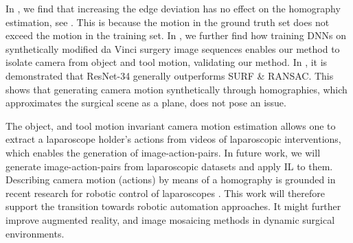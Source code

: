 
In , we find that increasing the edge deviation has no effect on the homography estimation, see . This is because the motion in the ground truth set does not exceed the motion in the training set. In , we further find how training DNNs on synthetically modified da Vinci surgery image sequences enables our method to isolate camera from object and tool motion, validating our method. In , it is demonstrated that ResNet-34 generally outperforms SURF \& RANSAC. This shows that generating camera motion synthetically through homographies, which approximates the surgical scene as a plane, does not pose an issue.


The object, and tool motion invariant camera motion estimation allows one to extract a laparoscope holder's actions from videos of laparoscopic interventions, which enables the generation of image-action-pairs. In future work, we will generate image-action-pairs from laparoscopic datasets and apply IL to them. Describing camera motion (actions) by means of a homography is grounded in recent research for robotic control of laparoscopes \cite{huber2021homographybased}. This work will therefore support the transition towards robotic automation approaches. It might further improve augmented reality, and image mosaicing methods in dynamic surgical environments.

